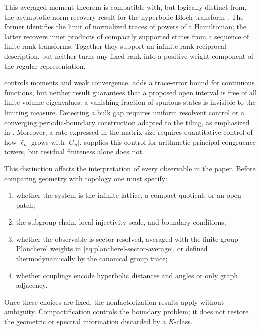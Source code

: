 \documentclass[11pt]{article}
\theoremstyle{definition}
\theoremstyle{remark}
\begin{document}
This averaged moment theorem is compatible with, but logically distinct
from, the asymptotic norm-recovery result for the hyperbolic Bloch transform
\cite{NagyRayan2024}.  The former identifies the limit of normalized traces
of powers of a Hamiltonian; the latter recovers inner products of
compactly supported states from a sequence of finite-rank transforms.
Together they support an infinite-rank reciprocal description, but neither
turns any fixed rank into a positive-weight component of the regular
representation.

 controls moments and weak convergence.
 adds a trace-error bound for
continuous functions, but neither result guarantees that a
proposed open interval is free of all finite-volume eigenvalues: a vanishing
fraction of spurious states is invisible to the limiting measure.  Detecting
a bulk gap requires uniform resolvent control or a converging
periodic-boundary construction adapted to the tiling, as emphasized in
\cite{LuxProdanCayley2024,LuxProdan2023}.  Moreover, a rate expressed in the
matrix size requires quantitative control of how \(\ell_n\) grows with
\(|G_n|\).   supplies this control for
arithmetic principal congruence towers, but residual finiteness alone does
not.

This distinction affects the interpretation of every observable in the
paper.  Before comparing geometry with topology one must specify:

\begin{enumerate}[label=\textup{(\roman*)},leftmargin=2.6em]
\item whether the system is the infinite lattice, a compact quotient, or an
  open patch;
\item the subgroup chain, local injectivity scale, and boundary conditions;
\item whether the observable is sector-resolved, averaged with the
  finite-group Plancherel weights in
  \eqref{eq:plancherel-sector-average}, or defined thermodynamically by the
  canonical group trace;
\item whether couplings encode hyperbolic distances and angles or only graph
  adjacency.
\end{enumerate}

Once these choices are fixed, the nonfactorization results apply without
ambiguity.  Compactification controls the boundary problem; it does not
restore the geometric or spectral information discarded by a \(K\)-class.
\end{document}
